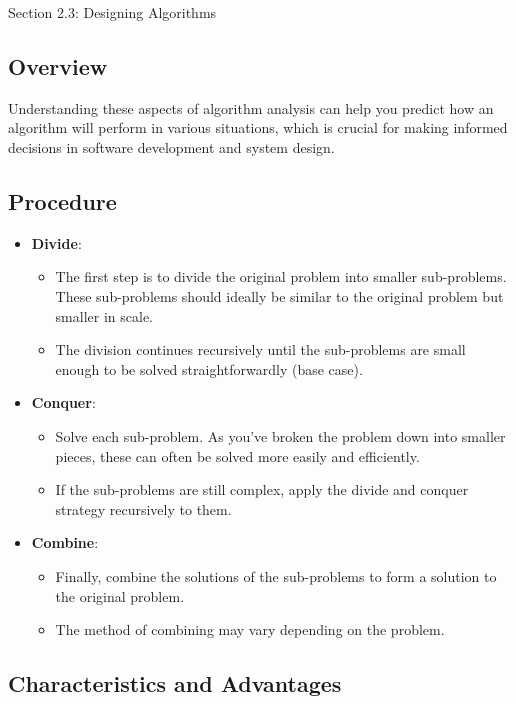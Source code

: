 \begin{notes}{Section 2.3: Designing Algorithms}
    \subsection*{Overview}

    Understanding these aspects of algorithm analysis can help you predict how an algorithm will perform in various situations, which is crucial for making informed decisions in software development 
    and system design.

    \subsection*{Procedure}

    \begin{itemize}
        \item \textbf{Divide}:
        \begin{itemize}
            \item The first step is to divide the original problem into smaller sub-problems. These sub-problems should ideally be similar to the original problem but smaller in scale.
            \item The division continues recursively until the sub-problems are small enough to be solved straightforwardly (base case).
        \end{itemize}
        \item \textbf{Conquer}:
        \begin{itemize}
            \item Solve each sub-problem. As you've broken the problem down into smaller pieces, these can often be solved more easily and efficiently.
            \item If the sub-problems are still complex, apply the divide and conquer strategy recursively to them.
        \end{itemize}
        \item \textbf{Combine}:
        \begin{itemize}
            \item Finally, combine the solutions of the sub-problems to form a solution to the original problem.
            \item The method of combining may vary depending on the problem.
        \end{itemize}
    \end{itemize}

    \subsection*{Characteristics and Advantages}


\end{notes}
